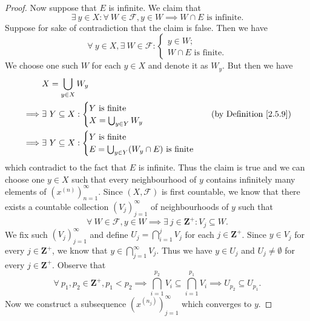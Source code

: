 \begin{proof}
    Now suppose that \(E\) is infinite.
    We claim that
    \[
        \exists\ y \in X : \forall\ W \in \mathcal{F}, y \in W \implies W \cap E \text{ is infinite}.
    \]
    Suppose for sake of contradiction that the claim is false.
    Then we have
    \[
        \forall\ y \in X, \exists\ W \in \mathcal{F} : \begin{cases}
            y \in W; \\
            W \cap E \text{ is finite}.
        \end{cases}
    \]
    We choose one such \(W\) for each \(y \in X\) and denote it as \(W_y\).
    But then we have
    \begin{align*}
                 & X = \bigcup_{y \in X} W_y                                                                \\
        \implies & \exists\ Y \subseteq X : \begin{cases}
            Y \text{ is finite} \\
            X = \bigcup_{y \in Y} W_y
        \end{cases} & \text{(by Definition \ref{2.5.9})} \\
        \implies & \exists\ Y \subseteq X : \begin{cases}
            Y \text{ is finite} \\
            E = \bigcup_{y \in Y} (W_y \cap E) \text{ is finite}
        \end{cases}
    \end{align*}
    which contradict to the fact that \(E\) is infinite.
    Thus the claim is true and we can choose one \(y \in X\) such that every neighbourhood of \(y\) contains infinitely many elements of \((x^{(n)})_{n = 1}^\infty\).
    Since \((X, \mathcal{F})\) is first countable, we know that there exists a countable collection \((V_j)_{j = 1}^\infty\) of neighbourhoods of \(y\) such that
    \[
        \forall\ W \in \mathcal{F}, y \in W \implies \exists\ j \in \mathbf{Z}^+ : V_j \subseteq W.
    \]
    We fix such \((V_j)_{j = 1}^\infty\) and define \(U_j = \bigcap_{i = 1}^j V_j\) for each \(j \in \mathbf{Z}^+\).
    Since \(y \in V_j\) for every \(j \in \mathbf{Z}^+\), we know that \(y \in \bigcap_{j = 1}^\infty V_j\).
    Thus we have \(y \in U_j\) and \(U_j \neq \emptyset\) for every \(j \in \mathbf{Z}^+\).
    Observe that
    \[
        \forall\ p_1, p_2 \in \mathbf{Z}^+, p_1 < p_2 \implies \bigcap_{i = 1}^{p_2} V_i \subseteq \bigcap_{i = 1}^{p_1} V_i \implies U_{p_2} \subseteq U_{p_1}.
    \]
    Now we construct a subsequence \((x^{(n_j)})_{j = 1}^\infty\) which converges to \(y\).

\end{proof}
